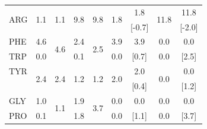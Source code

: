 \begin{table}
\begin{tabular}{l|cccc|cccc}
\hline
\multirow{2}{*}{ARG} & \multirow{2}{*}{1.1} & \multirow{2}{*}{1.1}   & \multirow{2}{*}{9.8}  & \multirow{2}{*}{9.8}   & \multirow{2}{*}{1.8} & 1.8                      & \multirow{2}{*}{11.8} & 11.8    \\
                     &                      &                        &                      &                         &                      & [-0.7]                    &                      & [-2.0]   \\
\hline
PHE                  & 4.6                  & \multirow{2}{*}{4.6}   & 2.4                  & \multirow{2}{*}{2.5}    &  3.9                 & 3.9                      & 0.0 & 0.0 \\
TRP                  & 0.0                  &                        & 0.1                  &                         &  0.0                 & [0.7]                    & 0.0 & [2.5]               \\
\hline
TYR                  & \multirow{2}{*}{2.4} & \multirow{2}{*}{2.4}  & \multirow{2}{*}{1.2}  &   \multirow{2}{*}{1.2}  &  \multirow{2}{*}{2.0} & 2.0                     & \multirow{2}{*}{0.0}  & 0.0   \\
                     &                      &                        &                      &                         &                       & [0.4]                   &                      & [1.2]  \\
\hline
GLY                  & 1.0                  & \multirow{2}{*}{1.1}   & 1.9                  & \multirow{2}{*}{3.7}    &   0.0                &  0.0                     & 0.0 & 0.0 \\
PRO                  & 0.1                  &                        & 1.8                  &                         &   0.0                &  [1.1]                   & 0.0 & [3.7]\\
\hline

\end{tabular} 
\end{table}

   \clearpage

    
   
      
